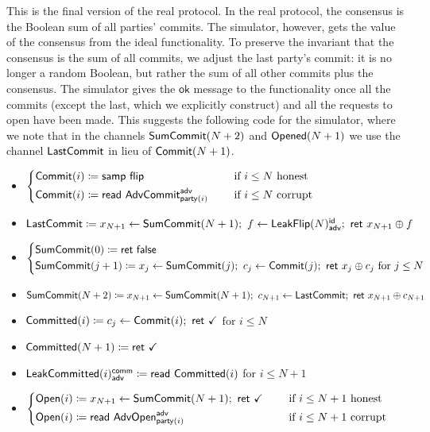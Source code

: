 \noindent This is the final version of the real protocol. In the real protocol, the consensus is the Boolean sum of all parties' commits. The simulator, however, gets the value of the consensus from the ideal functionality. To preserve the invariant that the consensus is the sum of all commits, we adjust the last party's commit: it is no longer a random Boolean, but rather the sum of all other commits plus the consensus. The simulator gives the $\mathsf{ok}$ message to the functionality once all the commits (except the last, which we explicitly construct) and all the requests to open have been made. This suggests the following code for the simulator, where we note that in the channels $\mathsf{SumCommit}(N+2)$ and $\mathsf{Opened}(N+1)$ we use the channel $\mathsf{LastCommit}$ in lieu of $\mathsf{Commit}(N+1)$.

\begin{itemize}
\item {\color{blue} $\begin{cases*} \Commit(i) \coloneqq \samp{\flip} & \hspace{10pt} \text{if $i \leq N$ honest} \\ \Commit(i) \coloneqq \read{\AdvCommit^\adv_{\party(i)}} & \hspace{10pt} \text{if $i \leq N$ corrupt} \end{cases*}$}
\item {\color{blue} $\LastCommit \coloneqq x_{N+1} \leftarrow \SumCommit(N+1); \ f \leftarrow \LeakFlip(N)^\id_\adv; \ \ret{x_{N+1} \oplus f}$}
\item {\color{blue} $\begin{cases*} \SumCommit(0) \coloneqq \ret{\false} \\ \SumCommit(j+1) \coloneqq x_j \leftarrow \SumCommit(j); \ c_j \leftarrow \Commit(j); \ \ret{x_j \oplus c_j} \text{ for $j \leq N$} \end{cases*}$}
\item {\color{blue} $\SumCommit(N+2) \coloneqq x_{N+1} \leftarrow \SumCommit(N+1); \ c_{N+1} \leftarrow \LastCommit; \ \ret{x_{N+1} \oplus c_{N+1}}$}
\item {\color{magenta} $\mathsf{Committed}(i) \coloneqq c_j \leftarrow \mathsf{Commit}(i); \ \mathsf{ret} \ \checkmark$ for $i \leq N$}
\item {\color{magenta} $\mathsf{Committed}(N+1) \coloneqq \mathsf{ret} \ \checkmark$}
\item {\color{magenta} $\mathsf{LeakCommitted}(i)^{\mathsf{comm}}_{\mathsf{adv}} \coloneqq \mathsf{read} \ \mathsf{Committed}(i)$ for $i \leq N+1$}
\item {\color{teal} $\begin{cases*} \Open(i) \coloneqq x_{N+1} \leftarrow \SumCommit(N+1); \ \ret{\checkmark} & \hspace{10pt} \text{if $i \leq N+1$ honest} \\ \Open(i) \coloneqq \read{\AdvOpen^\adv_{\party(i)}} & \hspace{10pt} \text{if $i \leq N+1$ corrupt} \end{cases*}$}

\end{itemize}
